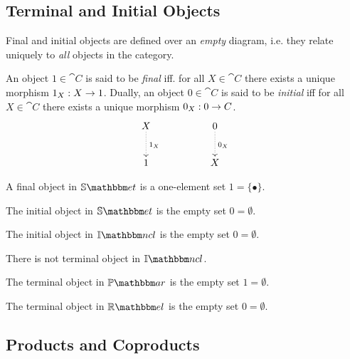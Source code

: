 
\subsection{Terminal and Initial Objects}
Final and initial objects are defined over an \emph{empty} diagram, i.e. they relate uniquely to \emph{all} objects in the category.


\begin{mydef}
	An object $1 \in \cat{C}$ is said to be \emph{final} iff. for all $X \in \cat{C}$ there exists a unique morphism $\arrow{X}{1_X}{1}$.
	Dually, an object $0 \in \cat{C}$ is said to be \emph{initial} iff for all $X \in \cat{C}$ there exists a unique morphism $\arrow{0}{0_X}{C}$.
	\[
	\xymatrix{
		X \ar@{.>}[d]^{1_X} & & 0 \ar@{.>}[d]^{0_X}  \\
		1  & & X
	}
	\]
\end{mydef}

\begin{myprop}
	A final object in $\catSET$ is a one-element set $1 = \{\bullet\}$.
\end{myprop}

\begin{myprop}
	The initial object in $\catSET$ is the empty set $0 = \emptyset$.
\end{myprop}

\begin{myprop}
	The initial object in $\catINCL$ is the empty set $0 = \emptyset$.
\end{myprop}

\begin{myprop}
	There is not terminal object in $\catINCL$.
\end{myprop}

\begin{myprop}
	The terminal object in $\catPAR$ is the empty set $1 = \emptyset$.
\end{myprop}

\begin{myprop}
	The terminal object in $\catREL$ is the empty set $0 = \emptyset$.
\end{myprop}



\subsection{Products and Coproducts}

